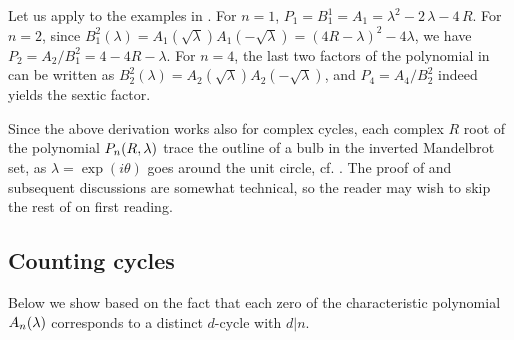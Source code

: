 \documentclass{ws-ijbc}
\begin{document}
%
Let us apply 
to the examples in .
For $n = 1$,
$P_1 = B_1^1 = A_1
  = \lambda^2 - 2\,\lambda - 4\,R$.
%
%
%
For $n = 2$, since
$B_1^2(\lambda)
=
A_1(\sqrt{\lambda})
A_1(-\sqrt{\lambda})
=
(4R-\lambda)^2 -4\lambda$,
%
we have $P_2 = A_2 / B_1^2 = 4 - 4R - \lambda$.
%
%
For $n = 4$,
the last two factors of the polynomial in 
can be written as
$B_2^2(\lambda) = A_2(\sqrt{\lambda}) A_2(-\sqrt{\lambda})$,
and
%
$P_4 = A_4 / B_2^2$
indeed yields the sextic factor.






Since the above derivation works also for complex cycles,
  each complex $R$ root of the polynomial $P_n(R, \lambda)$ trace
  the outline of a bulb in the inverted Mandelbrot set,
  as $\lambda=\exp(i\theta)$ goes around the unit circle,
  cf. \cite{stephenson2, stephenson3}. %
%
The proof of  and subsequent discussions
  are somewhat technical, so
  the reader may wish to skip the rest of 
  on first reading.






\subsection{\label{sec:degprimfac}Counting cycles}


Below we show  based on the fact that
  each zero of the characteristic polynomial $A_n(\lambda)$
  corresponds to a distinct $d$-cycle with $d|n$.

\end{document}
